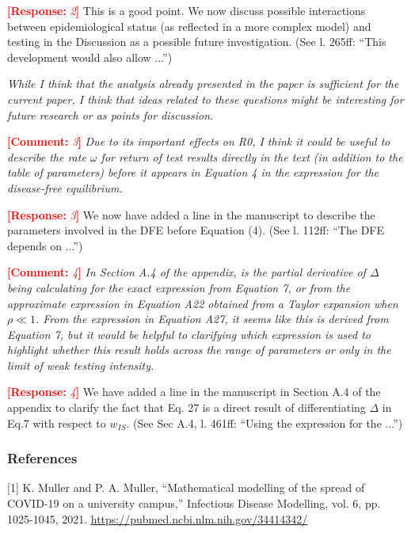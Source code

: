 \documentclass[12pt]{article}
\newcommand{\comment}{\showcomment}
\newcommand{\showcomment}[3]{\textcolor{#1}{\textbf{[#2: }\textsl{#3}\textbf{]}}}
\DeclareRobustCommand\_{\ifmmode\expandafter\subtxt\else\textunderscore\fi}
\newcommand{\com}[1]{\comment{red}{Comment}{#1}} %
\newcommand{\res}[1]{\comment{red}{Response}{#1}} %
\begin{document}
\res 2 This is a good point. We now discuss possible interactions between epidemiological status (as reflected in a more complex model) and testing in the Discussion as a possible future investigation. (See l. 265ff: ``This development would also allow ...'')

{\it While I think that the analysis already presented in the paper is sufficient for the current paper, I think that ideas related to these questions might be interesting for future research or as points for discussion.}

\com 3 
{\it Due to its important effects on R0, I think it could be useful to describe the rate $\omega$ for return of test results directly in the text (in addition to the table of parameters) before it appears in Equation 4 in the expression for the disease-free equilibrium.}
 
\res 3
We now have added a line in the manuscript to describe the parameters involved in the DFE before Equation (4). (See l. 112ff: ``The DFE depends on ...'')

\com 4
{\it In Section A.4 of the appendix, is the partial derivative of $\Delta$ being calculating for the exact expression from Equation 7, or from the approximate expression in Equation A22 obtained from a Taylor expansion when $\rho \ll 1$. From the expression in Equation A27, it seems like this is derived from Equation 7, but it would be helpful to clarifying which expression is used to highlight whether this result holds across the range of parameters or only in the limit of weak testing intensity.}

\res 4
We have added a line in the manuscript in Section A.4 of the appendix to clarify the fact that Eq. 27 is a direct result of differentiating $\Delta$ in Eq.7 with respect to $w_{IS}$. (See Sec A.4, l. 461ff: ``Using the expression for the ...'')

\subsubsection*{References}

[1] K. Muller and P. A. Muller, ``Mathematical modelling of the spread of COVID-19 on a university campus,'' Infectious Disease Modelling, vol. 6, pp. 1025-1045, 2021.
 \url{https://pubmed.ncbi.nlm.nih.gov/34414342/}

\end{document}
